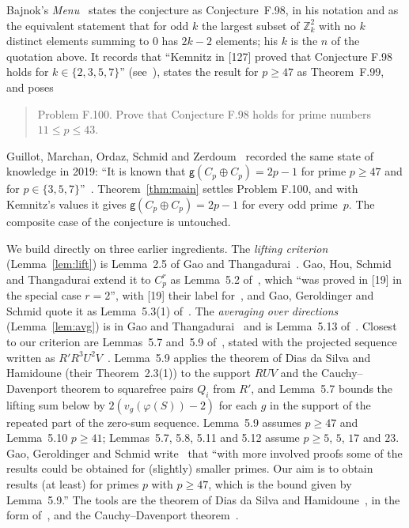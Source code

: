 \documentclass[11pt]{article}
\theoremstyle{remark}
\newcommand{\Z}{\mathbb{Z}}
\begin{document}
Bajnok's \emph{Menu}~\cite{Bajnok} states the conjecture as Conjecture~F.98, in his notation and as the equivalent statement that for odd $k$ the largest subset of $\Z_k^2$ with no $k$ distinct elements summing to $0$ has $2k-2$ elements; his $k$ is the $n$ of the quotation above. It records that ``Kemnitz in [127] proved that Conjecture F.98 holds for $k\in\{2,3,5,7\}$'' (see~\cite{Kemnitz}), states the result for $p\ge47$ as Theorem~F.99, and poses

\begin{quote}
Problem F.100. Prove that Conjecture F.98 holds for prime numbers $11\le p\le43$.
\end{quote}

Guillot, Marchan, Ordaz, Schmid and Zerdoum~\cite{GMOSZ} recorded the same state of knowledge in 2019: ``It is known that $\mathsf g(C_p\oplus C_p)=2p-1$ for prime $p\ge47$ and for $p\in\{3,5,7\}$''~\cite[p.~614]{GMOSZ}. Theorem~\ref{thm:main} settles Problem F.100, and with Kemnitz's values it gives $\mathsf g(C_p\oplus C_p)=2p-1$ for every odd prime~$p$. The composite case of the conjecture is untouched.

We build directly on three earlier ingredients. The \emph{lifting criterion} (Lemma~\ref{lem:lift}) is Lemma~2.5 of Gao and Thangadurai~\cite{GT}. Gao, Hou, Schmid and Thangadurai extend it to $C_p^r$ as Lemma~5.2 of~\cite{GHST}, which ``was proved in [19] in the special case $r=2$'', with [19] their label for~\cite{GT}, and Gao, Geroldinger and Schmid quote it as Lemma~5.3(1) of~\cite{GGS}. The \emph{averaging over directions} (Lemma~\ref{lem:avg}) is in Gao and Thangadurai~\cite[pp.~83--84]{GT} and is Lemma~5.13 of~\cite{GGS}. Closest to our criterion are Lemmas~5.7 and~5.9 of~\cite{GGS}, stated with the projected sequence written as $R'R^3U^2V$~\cite[p.~267]{GGS}. Lemma~5.9 applies the theorem of Dias da Silva and Hamidoune (their Theorem~2.3(1)) to the support $RUV$ and the Cauchy--Davenport theorem to squarefree pairs $Q_i$ from $R'$, and Lemma~5.7 bounds the lifting sum below by $2(v_g(\varphi(S))-2)$ for each $g$ in the support of the repeated part of the zero-sum sequence. Lemma~5.9 assumes $p\ge47$ and Lemma~5.10 $p\ge41$; Lemmas~5.7, 5.8, 5.11 and 5.12 assume $p\ge5$, $5$, $17$ and $23$. Gao, Geroldinger and Schmid write~\cite[p.~272]{GGS} that ``with more involved proofs some of the results could be obtained for (slightly) smaller primes. Our aim is to obtain results (at least) for primes $p$ with $p\ge47$, which is the bound given by Lemma~5.9.'' The tools are the theorem of Dias da Silva and Hamidoune~\cite{DSH}, in the form of~\cite[Theorem~2.3(1)]{GGS}, and the Cauchy--Davenport theorem~\cite{Cauchy,Davenport}.
\end{document}

